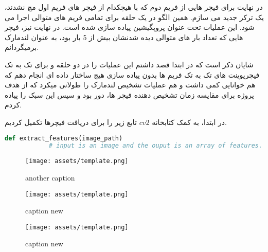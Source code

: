 \documentclass[a4paper,12pt]{article}
\begin{document}
در نهایت برای فیچر هایی از فریم دوم که با هیچکدام از فیچر های فریم اول مچ نشدند، یک ترکر جدید می سازم. همین الگو در یک حلقه برای تمامی فریم های متوالی اجرا می شود. این عملیات تحت عنوان پروپگیشین پیاده سازی شده است.
در نهایت نیز، فیچر هایی که تعداد بار های متوالی دیده شدنشان بیش از 5 بار بود، به عنوان لندمارک برمیگردانم.

شایان ذکر است که در ابتدا قصد داشتم این عملیات را در دو حلقه و برای تک به تک فیچرپوینت های تک به تک فریم ها بدون پیاده سازی هیچ ساختار داده ای انجام دهم که هم خوانایی کمی داشت و هم عملیات تشخیص لندمارک را طولانی میکرد که از هدف پروژه برای مقایسه زمان تشخیص دهنده فیچر ها، دور بود و سپس این سبک را پیاده کردم.



	\pagebreak
	
	در ابتدا، به کمک کتابخانه 
	$cv2$
	تابع زیر را برای دریافت فیچرها تکمیل کردیم. 
	
	\begin{latin}
		\begin{lstlisting}[language=Python, caption={extract feature function}]
			def extract_features(image_path)
			# input is an image and the ouput is an array of features.
		\end{lstlisting}
	\end{latin}
	
	


	\begin{figure}[ht]
		\centering
		\begin{minipage}[t]{0.32\textwidth}
			\centering
			\texttt{[image: assets/template.png]}
			\caption{\textcolor{CustomAccent}{another caption}}
		\end{minipage}
		\hfill
		\begin{minipage}[t]{0.32\textwidth}
			\centering
			\texttt{[image: assets/template.png]}
			\caption{\textcolor{CustomAccent}{caption new}}
		\end{minipage}
		\vspace{1em}
		\hfill
		\begin{minipage}[t]{0.32\textwidth}
			\centering
			\texttt{[image: assets/template.png]}
			\caption{\textcolor{CustomAccent}{caption new}}
		\end{minipage}
		\vspace{1em}
	\end{figure}
	
	
	
\clearpage
\end{document}
